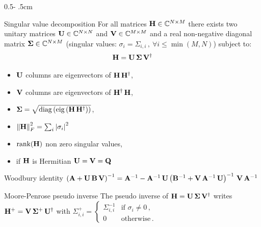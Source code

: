 \documentclass[a4paper]{cookbook}
\begin{document}
\begin{frame}
\begin{columns}[onlytextwidth]
\begin{column}{0.5\textwidth - .5cm}
    
    \begin{block}{Singular value decomposition}
    For all matrices $\mathbf{H}\in \mathbb{C}^{N\times M}$ there exists two unitary matrices $\mathbf{U} \in \mathbb{C}^{N\times N}$ and  $\mathbf{V} \in \mathbb{C}^{M\times M}$ and a real non-negative diagonal matrix $\mathbf{\Sigma} \in  \mathbb{C}^{N\times M}$ (singular values: $\sigma_i = \Sigma_{i,i}\,,\ \forall i\leq \min(M,N)$)  subject to:
    \begin{align*}
        \mathbf{H} = \mathbf{U}\,\mathbf{\Sigma}\,\mathbf{V}^{\dagger}
    \end{align*}
    \vspace{-2em}\begin{itemize}
        \item  $\mathbf{U}$ columns are eigenvectors of $\mathbf{H}\,\mathbf{H}^{\dagger}$,   
        \item  $\mathbf{V}$ columns are eigenvectors of $\mathbf{H}^{\dagger}\,\mathbf{H}$,  
        \item $\M{\Sigma} = \sqrt{\diag\left(\eig\left(\M{H}\,\M{H}\T\right)\right)} $,
        \item $\left\Vert \mathbf{H}\right\Vert^2_F = \sum_{i} \left\vert \sigma_i\right\vert^2 $
        \item $\rank(\M{H})$ non zero singular values,
        \item if $\mathbf{H}$ is Hermitian $\mathbf{U} = \mathbf{V} = \mathbf{Q}$
    \end{itemize}
    \end{block}

    \begin{block}{Woodbury identity}
    $\left(\mathbf{A} + \mathbf{U}\,\mathbf{B}\,\mathbf{V} \right)^{-1} = \mathbf{A}^{-1} - \mathbf{A}^{-1}\,\mathbf{U}\left( \mathbf{B}^{-1} + \mathbf{V}\,\mathbf{A}^{-1}\,\mathbf{U}\right)^{-1}\,\mathbf{V}\,\mathbf{A}^{-1}$
    \end{block}
    
    \begin{block}{Moore-Penrose pseudo inverse}
    The pseudo inverse of $\mathbf{H} = \mathbf{U}\,\mathbf{\Sigma}\,\mathbf{V}^{\dagger}$ writes  $\mathbf{H}^+ = \mathbf{V}\,\mathbf{\Sigma}^+\,\mathbf{U}^{\dagger}$ with $\Sigma_{i,i}^+ = \left\{
                            \begin{array}{ll}
                              \Sigma^{-1}_{i,i} &   \text{if }\sigma_i\neq0 \,, \\
                              0 & \text{otherwise} \,.
                            \end{array}
                                  \right.$ 
                                  

\end{block}
\end{column}
\end{columns}
\end{frame}
\end{document}
